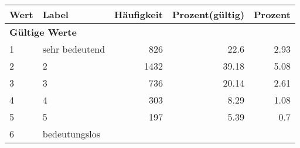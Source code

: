      \begin{longtable}{lXrrr}
     \toprule
     \textbf{Wert} & \textbf{Label} & \textbf{Häufigkeit} & \textbf{Prozent(gültig)} & \textbf{Prozent} \\
     \endhead
     \midrule
     \multicolumn{5}{l}{\textbf{Gültige Werte}}\\

     1 &
     \multicolumn{1}{X}{ sehr bedeutend   } &


       \num{826} &
       \num[round-mode=places,round-precision=2]{22.6} &
         \num[round-mode=places,round-precision=2]{2.93} \\

     2 &
     \multicolumn{1}{X}{ 2   } &


       \num{1432} &
       \num[round-mode=places,round-precision=2]{39.18} &
         \num[round-mode=places,round-precision=2]{5.08} \\

     3 &
     \multicolumn{1}{X}{ 3   } &


       \num{736} &
       \num[round-mode=places,round-precision=2]{20.14} &
         \num[round-mode=places,round-precision=2]{2.61} \\

     4 &
     \multicolumn{1}{X}{ 4   } &


       \num{303} &
       \num[round-mode=places,round-precision=2]{8.29} &
         \num[round-mode=places,round-precision=2]{1.08} \\

     5 &
     \multicolumn{1}{X}{ 5   } &


       \num{197} &
       \num[round-mode=places,round-precision=2]{5.39} &
         \num[round-mode=places,round-precision=2]{0.7} \\

     6 &
     \multicolumn{1}{X}{ bedeutungslos   } &



\end{longtable}
